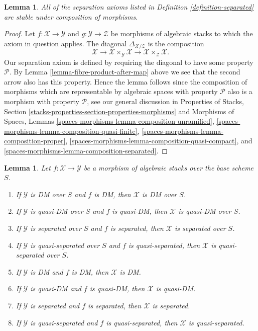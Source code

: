 \documentclass{stacks-project}
\theoremstyle{plain}
\newtheorem{lemma}[subsection]{Lemma}
\theoremstyle{definition}
\theoremstyle{remark}
\numberwithin{equation}{subsection}
\begin{document}
\begin{lemma}
\label{lemma-composition-separated}
All of the separation axioms listed in
Definition \ref{definition-separated}
are stable under composition of morphisms.
\end{lemma}

\begin{proof}
Let $f : \mathcal{X} \to \mathcal{Y}$ and
$g : \mathcal{Y} \to \mathcal{Z}$ be morphisms of algebraic stacks
to which the axiom in question applies.
The diagonal $\Delta_{\mathcal{X}/\mathcal{Z}}$ is the composition
$$
\mathcal{X} \longrightarrow
\mathcal{X} \times_\mathcal{Y} \mathcal{X} \longrightarrow
\mathcal{X} \times_\mathcal{Z} \mathcal{X}.
$$
Our separation axiom is defined by requiring the diagonal
to have some property $\mathcal{P}$. By
Lemma \ref{lemma-fibre-product-after-map}
above we see that the second arrow also has this property.
Hence the lemma follows since the composition of
morphisms which are representable by algebraic spaces with property
$\mathcal{P}$ also is a morphism with property $\mathcal{P}$, see
our general discussion in
Properties of Stacks,
Section \ref{stacks-properties-section-properties-morphisms}
and
Morphisms of Spaces, Lemmas
\ref{spaces-morphisms-lemma-composition-unramified},
\ref{spaces-morphisms-lemma-composition-quasi-finite},
\ref{spaces-morphisms-lemma-composition-proper},
\ref{spaces-morphisms-lemma-composition-quasi-compact}, and
\ref{spaces-morphisms-lemma-composition-separated}.
\end{proof}

\begin{lemma}
\label{lemma-separated-over-separated}
Let $f : \mathcal{X} \to \mathcal{Y}$ be a morphism of algebraic stacks
over the base scheme $S$.
\begin{enumerate}
\item If $\mathcal{Y}$ is DM over $S$ and $f$ is DM,
then $\mathcal{X}$ is DM over $S$.
\item If $\mathcal{Y}$ is quasi-DM over $S$ and $f$ is quasi-DM,
then $\mathcal{X}$ is quasi-DM over $S$.
\item If $\mathcal{Y}$ is separated over $S$ and $f$ is separated,
then $\mathcal{X}$ is separated over $S$.
\item If $\mathcal{Y}$ is quasi-separated over $S$ and $f$ is quasi-separated,
then $\mathcal{X}$ is quasi-separated over $S$.
\item If $\mathcal{Y}$ is DM and $f$ is DM,
then $\mathcal{X}$ is DM.
\item If $\mathcal{Y}$ is quasi-DM and $f$ is quasi-DM,
then $\mathcal{X}$ is quasi-DM.
\item If $\mathcal{Y}$ is separated and $f$ is separated,
then $\mathcal{X}$ is separated.
\item If $\mathcal{Y}$ is quasi-separated and $f$ is quasi-separated,
then $\mathcal{X}$ is quasi-separated.
\end{enumerate}
\end{lemma}
\end{document}
